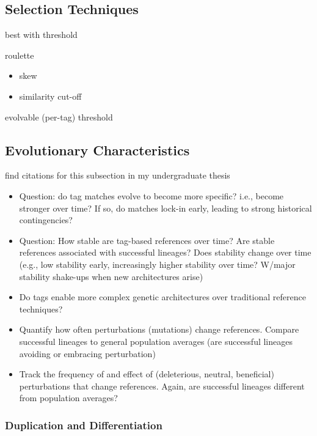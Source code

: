 \subsection{Selection Techniques}

best with threshold \citep{lalejini2019else}

roulette
\begin{itemize}
\item skew
\item similarity cut-off
\end{itemize}

evolvable (per-tag) threshold

\subsection{Evolutionary Characteristics}

find citations for this subsection in my undergraduate thesis

\begin{itemize}
  \item Question: do tag matches evolve to become more specific? i.e., become stronger over time?
        If so, do matches lock-in early, leading to strong historical contingencies?
  \item Question: How stable are tag-based references over time? Are stable references
        associated with successful lineages? Does stability change over time (e.g.,
        low stability early, increasingly higher stability over time? W/major stability
        shake-ups when new architectures arise)
  \item Do tags enable more complex genetic architectures over traditional reference
        techniques?
  \item Quantify how often perturbations (mutations) change references. Compare
        successful lineages to general population averages (are successful lineages
        avoiding or embracing perturbation)
  \item Track the frequency of and effect of (deleterious, neutral, beneficial)
        perturbations that change references. Again, are successful lineages different
        from population averages?
\end{itemize}

\subsubsection{Duplication and Differentiation}

